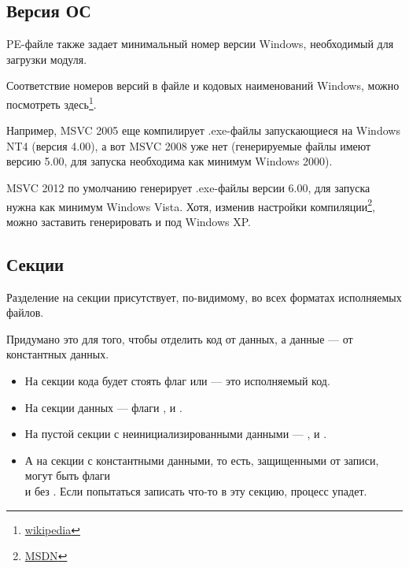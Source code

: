 \subsection{Версия ОС}

PE-файле также задает минимальный номер версии Windows, необходимый для загрузки модуля.

Соответствие номеров версий в файле и кодовых наименований Windows, можно посмотреть
здесь\footnote{\href{http://go.yurichev.com/17044}{wikipedia}}.

Например, \ac{MSVC} 2005 еще компилирует .exe-файлы запускающиеся на Windows NT4 (версия 4.00), а вот \ac{MSVC} 2008 уже нет 
(генерируемые файлы имеют версию 5.00, для запуска необходима как минимум Windows 2000).

\ac{MSVC} 2012 по умолчанию генерирует .exe-файлы версии 6.00, для запуска нужна как минимум Windows Vista. 
Хотя, изменив настройки компиляции\footnote{\href{http://go.yurichev.com/17045}{MSDN}},
можно заставить генерировать и под Windows XP.

\subsection{Секции}

Разделение на секции присутствует, по-видимому, во всех форматах исполняемых файлов.

Придумано это для того, чтобы отделить код от данных, а данные --- от константных данных.


\begin{itemize}
\item На секции кода будет стоять флаг  или  --- это исполняемый код.

\item На секции данных --- флаги , 
 и .

\item На пустой секции с неинициализированными данными --- ,  и .

\item А на секции с константными данными, то есть, защищенными от записи, могут быть флаги \\
 и  без . 
Если попытаться записать что-то в эту секцию, процесс упадет.
\end{itemize}

